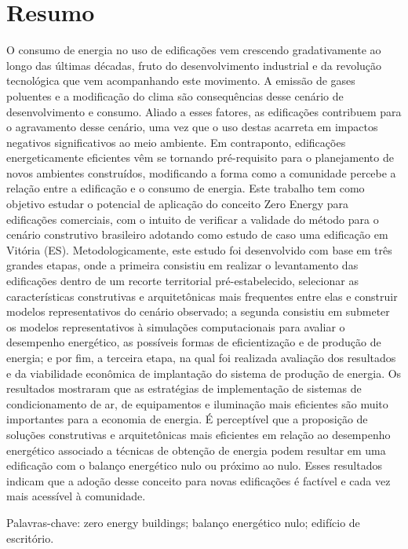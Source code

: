 \section*{Resumo}
\vspace*{1.5cm} %
\thispagestyle{empty}
\begin{onehalfspace}
  \noindent O consumo de energia no uso de edificações vem crescendo gradativamente ao longo das últimas décadas, fruto do desenvolvimento industrial e da revolução tecnológica que vem acompanhando este movimento. A emissão de gases poluentes e a modificação do clima são consequências desse cenário de desenvolvimento e consumo. Aliado a esses fatores, as edificações contribuem para o agravamento desse cenário, uma vez que o uso destas acarreta em impactos negativos significativos ao meio ambiente. Em contraponto, edificações energeticamente eficientes vêm se tornando pré-requisito para o planejamento de novos  ambientes construídos, modificando a forma como a comunidade percebe a relação entre a edificação e  o consumo de energia. Este trabalho tem como objetivo estudar o potencial de aplicação do conceito Zero Energy  para edificações comerciais, com o intuito de verificar a validade do método para o cenário construtivo brasileiro adotando como estudo de caso uma edificação em Vitória (ES). Metodologicamente, este estudo foi desenvolvido com base em três grandes etapas, onde a primeira consistiu em realizar o levantamento das edificações dentro de um recorte territorial pré-estabelecido, selecionar as características construtivas e arquitetônicas mais frequentes entre elas e construir modelos representativos do cenário observado; a segunda consistiu em  submeter os modelos representativos à simulações computacionais para avaliar o desempenho energético, as possíveis formas de eficientização e de produção de energia; e por fim, a terceira etapa, na qual foi realizada avaliação dos resultados e da viabilidade econômica de implantação do sistema de produção de energia. Os resultados mostraram que as estratégias de implementação de sistemas de condicionamento de ar, de equipamentos e iluminação mais eficientes são muito importantes para a economia de energia. É perceptível que a proposição de soluções construtivas e arquitetônicas mais eficientes em relação ao desempenho energético associado a técnicas de obtenção de energia podem resultar em uma edificação com o balanço energético nulo ou próximo ao nulo. Esses resultados indicam que a adoção desse conceito para novas edificações é factível e cada vez mais acessível à comunidade.\par \vspace*{0.5cm}
  \noindent Palavras-chave: zero energy buildings; balanço energético nulo; edifício de escritório.\pagebreak
\end{onehalfspace}
